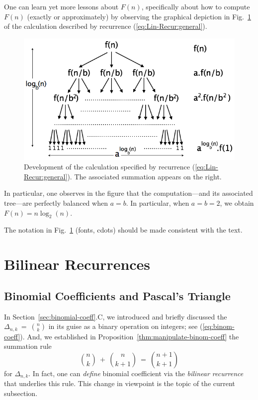 One can learn yet more lessons about $F(n)$, specifically about how to
compute $F(n)$ (exactly or approximately) by observing the graphical
depiction in Fig.~\ref{fig:masterTheorem} of the calculation described
by recurrence (\ref{eq:Lin-Recur:general}).
\begin{figure}[htb]
\begin{center}
       \includegraphics[scale=0.4]{FiguresMaths/MasterTheoremgeneral}
\caption{Development of the calculation specified by recurrence
  (\ref{eq:Lin-Recur:general}).  The associated summation appears on
  the right.
\label{fig:masterTheorem}}
\end{center}
\end{figure}
In particular, one observes in the figure that the computation---and
its associated tree---are perfectly balanced when $a=b$.  In
particular, when $a=b=2$, we obtain $F(n) = n \log_2(n)$.

{\Arny The notation in Fig.~\ref{fig:masterTheorem} (fonts, cdots)
  should be made consistent with the text.}


\section{Bilinear Recurrences}
\label{sec:bilinear-recurrences}

\subsection{Binomial Coefficients and Pascal's Triangle}
\label{sec:binomial-coeff+Pascal}

In Section~\ref{sec:binomial-coeff}.C, we introduced and briefly
discussed the  $\displaystyle \Delta_{n,k}
\ = \ {n \choose k}$ in its guise as a binary operation on integers;
see (\ref{eq:binom-coeff}).  And, we established in
Proposition~\ref{thm:manipulate-binom-coeff} the summation rule
\[ {n \choose k} \ + \ {n \choose {k+1}} \ = \ {{n+1} \choose {k+1}} \]
for $\Delta_{n,k}$.  In fact, one can {\em define} binomial
coefficient via the {\em bilinear recurrence} that underlies this
rule.  This change in viewpoint is the topic of the current
subsection.

